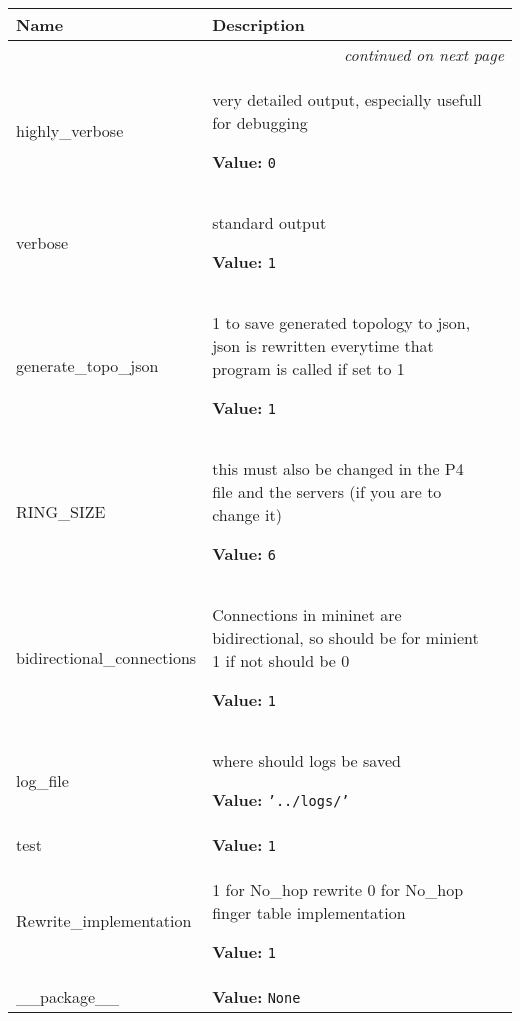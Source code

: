     \vspace{-1cm}
\hspace{\varindent}\begin{longtable}{|p{\varnamewidth}|p{\vardescrwidth}|l}
\cline{1-2}
\cline{1-2} \centering \textbf{Name} & \centering \textbf{Description}& \\
\cline{1-2}
\endhead\cline{1-2}\multicolumn{3}{r}{\small\textit{continued on next page}}\\\endfoot\cline{1-2}
\endlastfoot\raggedright h\-i\-g\-h\-l\-y\-\_\-v\-e\-r\-b\-o\-s\-e\- & \raggedright very detailed output, especially usefull for debugging

\textbf{Value:} 
{\tt 0}&\\
\cline{1-2}
\raggedright v\-e\-r\-b\-o\-s\-e\- & \raggedright standard output

\textbf{Value:} 
{\tt 1}&\\
\cline{1-2}
\raggedright g\-e\-n\-e\-r\-a\-t\-e\-\_\-t\-o\-p\-o\-\_\-j\-s\-o\-n\- & \raggedright 1 to save generated topology to json, json is rewritten everytime
          that program is called if set to 1

\textbf{Value:} 
{\tt 1}&\\
\cline{1-2}
\raggedright R\-I\-N\-G\-\_\-S\-I\-Z\-E\- & \raggedright this must also be changed in the P4 file and the servers (if you 
          are to change it)

\textbf{Value:} 
{\tt 6}&\\
\cline{1-2}
\raggedright b\-i\-d\-i\-r\-e\-c\-t\-i\-o\-n\-a\-l\-\_\-c\-o\-n\-n\-e\-c\-t\-i\-o\-n\-s\- & \raggedright Connections in mininet are bidirectional, so should be for 
          minient 1 if not should be 0

\textbf{Value:} 
{\tt 1}&\\
\cline{1-2}
\raggedright l\-o\-g\-\_\-f\-i\-l\-e\- & \raggedright where should logs be saved

\textbf{Value:} 
{\tt \texttt{'}\texttt{../logs/}\texttt{'}}&\\
\cline{1-2}
\raggedright t\-e\-s\-t\- & \raggedright \textbf{Value:} 
{\tt 1}&\\
\cline{1-2}
\raggedright R\-e\-w\-r\-i\-t\-e\-\_\-i\-m\-p\-l\-e\-m\-e\-n\-t\-a\-t\-i\-o\-n\- & \raggedright 1 for No\_hop rewrite 0 for No\_hop finger table implementation

\textbf{Value:} 
{\tt 1}&\\
\cline{1-2}
\raggedright \_\-\_\-p\-a\-c\-k\-a\-g\-e\-\_\-\_\- & \raggedright \textbf{Value:} 
{\tt None}&\\
\cline{1-2}
\end{longtable}


